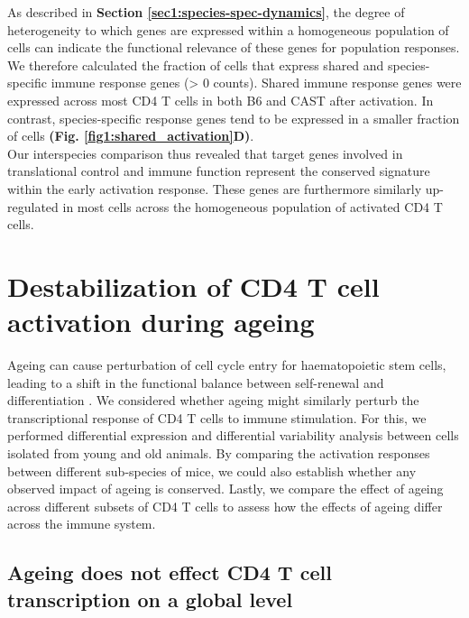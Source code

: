 As described in \textbf{Section \ref{sec1:species-spec-dynamics}}, the degree of heterogeneity to which genes are expressed within a homogeneous population of cells can indicate the functional relevance of these genes for population responses. We therefore calculated the fraction of cells that express shared and species-specific immune response genes (> 0 counts). Shared immune response genes were expressed across most CD4\plus{} T cells in both B6 and CAST after activation. In contrast, species-specific response genes tend to be expressed in a smaller fraction of cells \textbf{(Fig. \ref{fig1:shared_activation}D)}. \\

Our interspecies comparison thus revealed that target genes involved in translational control and immune function represent the conserved signature within the early activation response. These genes are furthermore similarly up-regulated in most cells across the homogeneous population of activated CD4\plus{} T cells. 

\newpage

\section{Destabilization of CD4\plus{} T cell activation during ageing}

Ageing can cause perturbation of cell cycle entry for haematopoietic stem cells, leading to a shift in the functional balance between self-renewal and differentiation \citep{Kowalczyk2015}. We considered whether ageing might similarly perturb the transcriptional response of CD4\plus{} T cells to immune stimulation. For this, we performed differential expression and differential variability analysis between cells isolated from young and old animals. By comparing the activation responses between different sub-species of mice, we could also establish whether any observed impact of ageing is conserved. Lastly, we compare the effect of ageing across different subsets of CD4\plus{} T cells to assess how the effects of ageing differ across the immune system.

\subsection{Ageing does not effect CD4\plus{} T cell transcription on a global level}
\label{sec1:global_changes}

